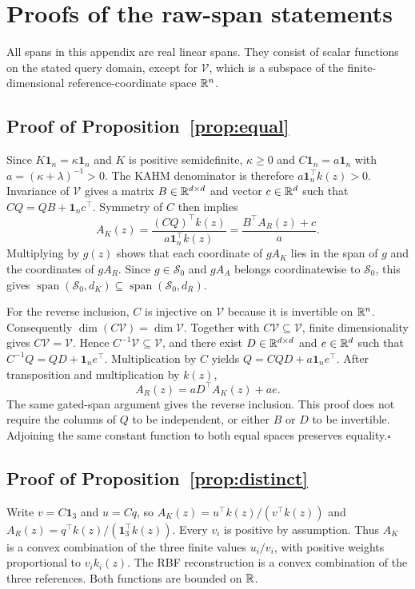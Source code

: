 
\section{Proofs of the raw-span statements}\label{app:proofs}
All spans in this appendix are real linear spans. They consist of scalar functions on the stated query domain, except for $\mathcal V$, which is a subspace of the finite-dimensional reference-coordinate space $\mathbb R^n$.

\subsection{Proof of Proposition~\ref{prop:equal}}
Since $K\mathbf1_n=\kappa\mathbf1_n$ and $K$ is positive semidefinite, $\kappa\geq0$ and
$C\mathbf1_n=a\mathbf1_n$ with $a=(\kappa+\lambda)^{-1}>0$.
The KAHM denominator is therefore $a\mathbf1_n^\top k(z)>0$. Invariance of $\mathcal V$ gives a matrix $B\in\mathbb R^{d\times d}$ and vector $c\in\mathbb R^d$ such that $CQ=QB+\mathbf1_n c^\top$. Symmetry of $C$ then implies
\[
 A_K(z)=\frac{(CQ)^\top k(z)}{a\mathbf1_n^\top k(z)}
 =\frac{B^\top A_R(z)+c}{a}.
\]
Multiplying by $g(z)$ shows that each coordinate of $gA_K$ lies in the span of $g$ and the coordinates of $gA_R$. Since $g\in\mathcal S_0$ and $gA_A$ belongs coordinatewise to $\mathcal S_0$, this gives
$\operatorname{span}(\mathcal S_0,d_K)\subseteq\operatorname{span}(\mathcal S_0,d_R)$.

For the reverse inclusion, $C$ is injective on $\mathcal V$ because it is invertible on $\mathbb R^n$. Consequently $\dim(C\mathcal V)=\dim\mathcal V$. Together with $C\mathcal V\subseteq\mathcal V$, finite dimensionality gives $C\mathcal V=\mathcal V$. Hence $C^{-1}\mathcal V\subseteq\mathcal V$, and there exist $D\in\mathbb R^{d\times d}$ and $e\in\mathbb R^d$ such that $C^{-1}Q=QD+\mathbf1_n e^\top$. Multiplication by $C$ yields
$Q=CQD+a\mathbf1_n e^\top$. After transposition and multiplication by $k(z)$,
\[
 A_R(z)=aD^\top A_K(z)+ae.
\]
The same gated-span argument gives the reverse inclusion. This proof does not require the columns of $Q$ to be independent, or either $B$ or $D$ to be invertible. Adjoining the same constant function to both equal spaces preserves equality.\hfill$\square$

\subsection{Proof of Proposition~\ref{prop:distinct}}
Write $v=C\mathbf1_3$ and $u=Cq$, so
$A_K(z)=u^\top k(z)/(v^\top k(z))$ and
$A_R(z)=q^\top k(z)/(\mathbf1_3^\top k(z))$.
Every $v_i$ is positive by assumption. Thus $A_K$ is a convex combination of the three finite values $u_i/v_i$, with positive weights proportional to $v_i k_i(z)$. The RBF reconstruction is a convex combination of the three references. Both functions are bounded on $\mathbb R$.

